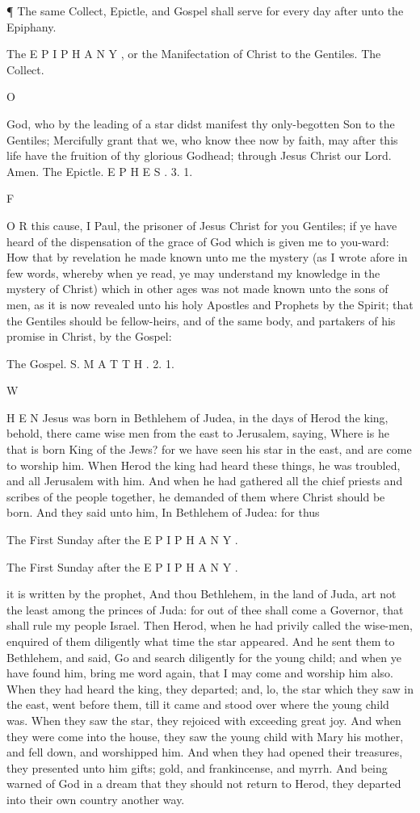 ¶ The same Collect, Epictle, and Gospel shall serve for every day after unto the Epiphany.

The E P I P H A N Y , or the Manifectation of Christ to the Gentiles. The Collect.

O

God, who by the leading of a star didst manifest thy only-begotten Son to the Gentiles; Mercifully grant that we, who know thee now by faith, may after this life have the fruition of thy glorious Godhead; through Jesus Christ our Lord. Amen. The Epictle. E P H E S . 3. 1.

F

O R this cause, I Paul, the prisoner of Jesus Christ for you Gentiles; if ye have heard of the dispensation of the grace of God which is given me to you-ward: How that by revelation he made known unto me the mystery (as I wrote afore in few words, whereby when ye read, ye may understand my knowledge in the mystery of Christ) which in other ages was not made known unto the sons of men, as it is now revealed unto his holy Apostles and Prophets by the Spirit; that the Gentiles should be fellow-heirs, and of the same body, and partakers of his promise in Christ, by the Gospel:

The Gospel. S. M A T T H . 2. 1.

W

H E N Jesus was born in Bethlehem of Judea, in the days of Herod the king, behold, there came wise men from the east to Jerusalem, saying, Where is he that is born King of the Jews? for we have seen his star in the east, and are come to worship him. When Herod the king had heard these things, he was troubled, and all Jerusalem with him. And when he had gathered all the chief priests and scribes of the people together, he demanded of them where Christ should be born. And they said unto him, In Bethlehem of Judea: for thus

The First Sunday after the E P I P H A N Y .

The First Sunday after the E P I P H A N Y .

it is written by the prophet, And thou Bethlehem, in the land of Juda, art not the least among the princes of Juda: for out of thee shall come a Governor, that shall rule my people Israel. Then Herod, when he had privily called the wise-men, enquired of them diligently what time the star appeared. And he sent them to Bethlehem, and said, Go and search diligently for the young child; and when ye have found him, bring me word again, that I may come and worship him also. When they had heard the king, they departed; and, lo, the star which they saw in the east, went before them, till it came and stood over where the young child was. When they saw the star, they rejoiced with exceeding great joy. And when they were come into the house, they saw the young child with Mary his mother, and fell down, and worshipped him. And when they had opened their treasures, they presented unto him gifts; gold, and frankincense, and myrrh. And being warned of God in a dream that they should not return to Herod, they departed into their own country another way.

